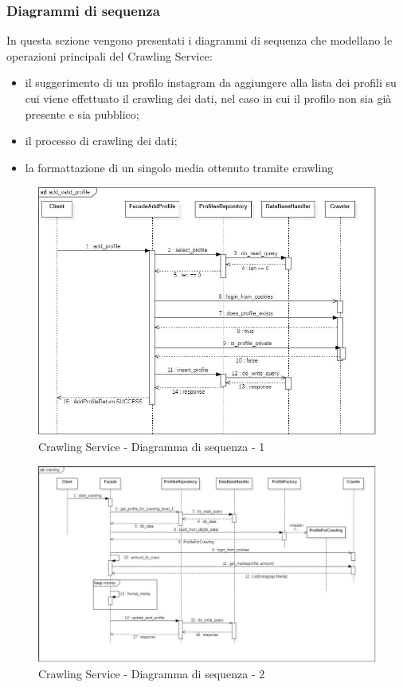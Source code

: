 \subsubsection{Diagrammi di sequenza}
In questa sezione vengono presentati i diagrammi di sequenza che modellano le operazioni principali del Crawling Service:
\begin{itemize}
    \item il suggerimento di un profilo instagram da aggiungere alla lista dei profili su cui viene effettuato il crawling dei dati, nel caso in cui il profilo non sia già presente e sia pubblico;
    \item il processo di crawling dei dati;
    \item la formattazione di un singolo media ottenuto tramite crawling
\end{itemize}
\begin{figure}[!htp]
    \centering
    \includegraphics[scale=0.65]{Contenuto/Immagini/seq1-CS.JPG}
    \caption{Crawling Service - Diagramma di sequenza - 1}
\end{figure}
\begin{figure}[H]
    \centerfloat
    \includegraphics[scale=0.55]{Contenuto/Immagini/seq2-CS.JPG}
    \caption{Crawling Service - Diagramma di sequenza - 2}
\end{figure}
